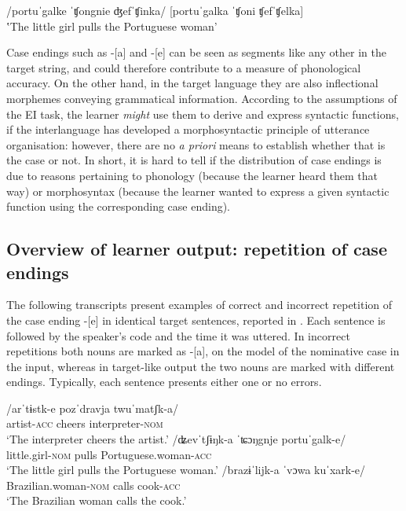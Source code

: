 \ea%
    \label{ex:04:4}
    \ea\label{ex:04:4a}
    /portuˈgalke ˈʧongnie ʤefˈʧinka/
    \ex\label{ex:04:4b}
    [portuˈgalka ˈʧoni ʧefˈʧelka]\\
    ‛The little girl pulls the Portuguese woman'
    \z
\z

Case endings such as -[a] and -[e] can be seen as segments like any other in the target string, and could therefore contribute to a measure of phonological accuracy. On the other hand, in the target language they are also inflectional morphemes conveying grammatical information. According to the assumptions of the EI task, the learner \textit{might} use them to derive and express syntactic functions, if the interlanguage has developed a morphosyntactic principle of utterance organisation: however, there are no \textit{a priori} means to establish whether that is the case or not. In short, it is hard to tell if the distribution of case endings is due to reasons pertaining to phonology (because the learner heard them that way) or morphosyntax (because the learner wanted to express a given syntactic function using the corresponding case ending).

\subsection{Overview of learner output: repetition of case endings}\label{sec:04:2.2}

The following transcripts present examples of correct  and incorrect  repetition of the case ending -[e] in identical target sentences, reported in . Each sentence is followed by the speaker’s code and the time it was uttered. In incorrect repetitions both nouns are marked as -[a], on the model of the nominative case in the input, whereas in target-like output the two nouns are marked with different endings. Typically, each sentence presents either one or no errors.

\ea%
    \label{ex:04:5}
    \ea\label{ex:04:5a}
    \gll    /arˈtɨstk-e   pozˈdravja   twuˈmatʃk-a/\\
            artist-\textsc{acc}  cheers    interpreter-\textsc{nom}\\
    \glt    ‘The interpreter cheers the artist.’
    \ex\label{ex:04:5b}
    \gll    /ʥevˈtʃɨŋk-a  ˈʨɔŋgnje   portuˈgalk-e/\\
            little.girl-\textsc{nom}  pulls    Portuguese.woman-\textsc{acc}\\
    \glt    ‘The little girl pulls the Portuguese woman.’
    \ex\label{ex:04:5c}
    \gll    /brazɨˈlijk-a     ˈvɔwa   kuˈxark-e/\\
            Brazilian.woman-\textsc{nom}  calls  cook-\textsc{acc}\\
    \glt    ‘The Brazilian woman calls the cook.’
    \z
\z

